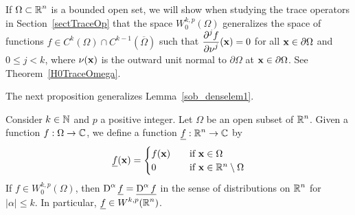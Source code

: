 If $\displaystyle \Omega \subset \mathbb{R}^n$ is a bounded open set, we will
show when studying the trace operators in Section~\ref{sectTraceOp}
that the space $\displaystyle W^{k,p}_0(\Omega)$ generalizes the space
of functions $\displaystyle f \in C^k(\Omega) \cap C^{k-1}(\overline{\Omega})$
such that $\displaystyle \frac{\displaystyle \partial^{j}{f}} {\displaystyle \partial \mathbf{\nu}^{j}}(\mathbf{x}) = 0$ for all
$\mathbf{x} \in \partial \Omega$ and $0 \leq j <k$, where
$\mathbf{\nu}(\mathbf{x})$ is the outward unit normal to $\partial \Omega$
at $\mathbf{x} \in \partial \Omega$.  See Theorem~\ref{H0TraceOmega}.

The next proposition generalizes Lemma~\ref{sob_denselem1}.

\begin{prop} \label{sob_expand_WKP}
Consider $k\in \mathbb{N}$ and $p$ a positive integer.  Let $\Omega$ be an
open subset of $\displaystyle \mathbb{R}^n$.  Given a function
$f:\Omega \rightarrow \mathbb{C}$,
we define a function $\displaystyle \underline{f}:\mathbb{R}^n\rightarrow \mathbb{C}$ by
\[
\underline{f}(\mathbf{x}) =
\begin{cases}
f(\mathbf{x}) & \quad \text{if} \ \mathbf{x} \in \Omega \\
0 & \quad \text{if} \ \mathbf{x} \in \mathbb{R}^n \setminus \Omega
\end{cases}
\]
If $\displaystyle f \in W^{k,p}_0(\Omega)$, then
$\displaystyle \operatorname{D}^\alpha \underline{f} = \underline{\operatorname{D}^\alpha f}$
in the sense of distributions on $\displaystyle \mathbb{R}^n$ for
$|\alpha|\leq k$.  In particular,
$\displaystyle \underline{f} \in W^{k,p}(\mathbb{R}^n)$.
\end{prop}

